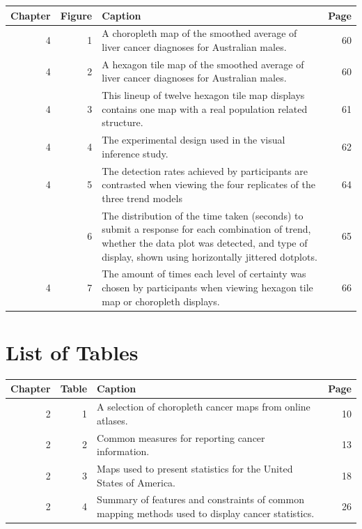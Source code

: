 \documentclass{monashthesis}
\begin{document}
\begin{tabular}{rr>{\raggedright\arraybackslash}p{25em}r}
\toprule
Chapter & Figure & Caption & Page\\
\midrule
4 & 1 & A choropleth map of the smoothed average of liver cancer diagnoses for Australian males. & 60\\
4 & 2 & A hexagon tile map of the smoothed average of liver cancer diagnoses for Australian males. & 60\\
4 & 3 & This lineup of twelve hexagon tile map displays contains one map with a real population related structure. & 61\\
4 & 4 & The experimental design used in the visual inference study. & 62\\
4 & 5 & The detection rates achieved by participants are contrasted when viewing the four replicates of the three trend models & 64\\
\addlinespace
4 & 6 & The distribution of the time taken (seconds) to submit a response for each combination of trend, whether the data plot was detected, and type of display, shown using horizontally jittered dotplots. & 65\\
4 & 7 & The amount of times each level of certainty was chosen by participants when viewing hexagon tile map or choropleth displays. & 66\\
\bottomrule
\end{tabular}

\hypertarget{list-of-tables}{%
\chapter*{List of Tables}\label{list-of-tables}}

\begin{tabular}{rr>{\raggedright\arraybackslash}p{25em}r}
\toprule
Chapter & Table & Caption & Page\\
\midrule
2 & 1 & A selection of choropleth cancer maps from online atlases. & 10\\
2 & 2 & Common measures for reporting cancer information. & 13\\
2 & 3 & Maps used to present statistics for the United States of America. & 18\\
2 & 4 & Summary of features and constraints of common mapping methods used to display
cancer statistics. & 26\\
\bottomrule
\end{tabular}
\end{document}
